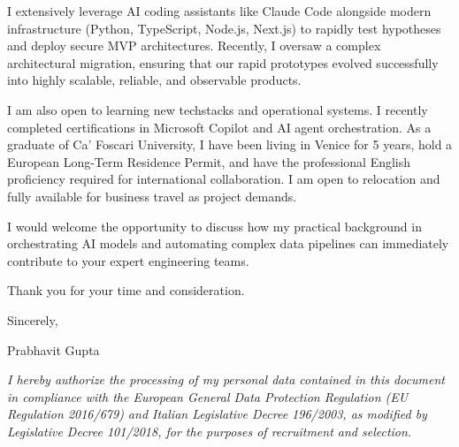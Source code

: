 \documentclass[a4paper,11pt]{article}
\begin{document}
I extensively leverage AI coding assistants like Claude Code alongside modern infrastructure (Python, TypeScript, Node.js, Next.js) to rapidly test hypotheses and deploy secure MVP architectures. Recently, I oversaw a complex architectural migration, ensuring that our rapid prototypes evolved successfully into highly scalable, reliable, and observable products.

I am also open to learning new techstacks and operational systems. I recently completed certifications in Microsoft Copilot and AI agent orchestration. As a graduate of Ca' Foscari University, I have been living in Venice for 5 years, hold a European Long-Term Residence Permit, and have the professional English proficiency required for international collaboration. I am open to relocation and fully available for business travel as project demands.

I would welcome the opportunity to discuss how my practical background in orchestrating AI models and automating complex data pipelines can immediately contribute to your expert engineering teams.

Thank you for your time and consideration.

Sincerely,

Prabhavit Gupta

\vspace{1em}
\textit{\footnotesize I hereby authorize the processing of my personal data contained in this document in compliance with the European General Data Protection Regulation (EU Regulation 2016/679) and Italian Legislative Decree 196/2003, as modified by Legislative Decree 101/2018, for the purposes of recruitment and selection.}
\end{document}
